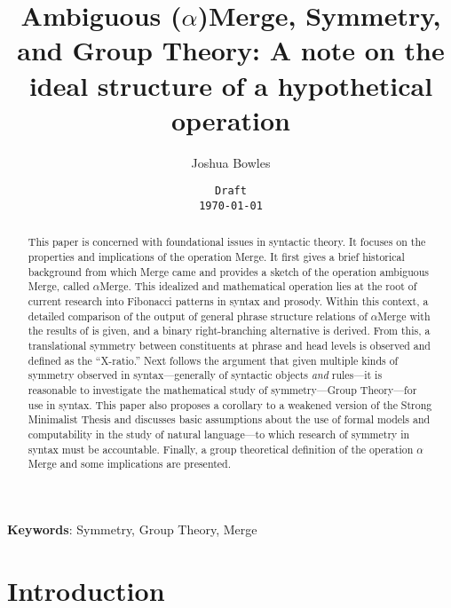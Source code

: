 \documentclass[11pt,twoside]{article}
\theoremstyle{plain}
\numberwithin{equation}{section}
\theoremstyle{definition}
\newtheorem{phrase string}{Phrase String}
\begin{document}
\title{Ambiguous ($\alpha$)Merge, Symmetry, and Group Theory: A note on the ideal structure of a hypothetical operation}

\author{Joshua Bowles}
\date{{\tt Draft\\ \today}}
\maketitle


\begin{abstract} This paper is concerned with foundational issues in syntactic theory. It focuses on the properties and implications of the operation Merge. It first gives a brief historical background from which Merge came and provides a sketch of the operation ambiguous Merge, called $\alpha$Merge. This idealized and mathematical operation lies at the root of current research into Fibonacci patterns in syntax and prosody. Within this context, a detailed comparison of the output of general phrase structure relations of $\alpha$Merge with the results of \cite{medeiros:2008} is given, and a binary right-branching alternative is derived. From this, a translational symmetry between constituents at phrase and head levels is observed and defined as the ``X-ratio.'' Next follows the argument that given multiple kinds of symmetry observed in syntax---generally of syntactic objects \textsl{and} rules---it is reasonable to investigate the mathematical study of symmetry---Group Theory---for use in syntax. This paper also proposes a corollary to a weakened version of the Strong Minimalist Thesis and discusses basic assumptions about the use of formal models and computability in the study of natural language---to which research of symmetry in syntax must be accountable. Finally, a group theoretical definition of the operation $\alpha$Merge and some implications are presented.  
\end{abstract}
\textbf{Keywords}: Symmetry, Group Theory, Merge\\


\section{Introduction}\label{intro}
\end{document}
